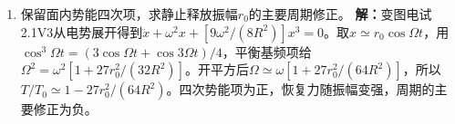 \documentclass[UTF8,fontset=fandol,a4paper,11pt]{ctexart}
\begin{document}
\begin{enumerate}
\item 保留面内势能四次项，求静止释放振幅$r_0$的主要周期修正。
\textbf{解：}变图电试2.1V3从电势展开得到$\ddot x+\omega^2x+[9\omega^2/(8R^2)]x^3=0$。取$x\simeq r_0\cos\Omega t$，用$\cos^3\Omega t=(3\cos\Omega t+\cos3\Omega t)/4$，平衡基频项给$\Omega^2=\omega^2[1+27r_0^2/(32R^2)]$。开平方后$\Omega\simeq\omega[1+27r_0^2/(64R^2)]$，所以$T/T_0\simeq1-27r_0^2/(64R^2)$。四次势能项为正，恢复力随振幅变强，周期的主要修正为负。
\begin{center}\begin{minipage}{.98\linewidth}\centering
{}
\end{minipage}
\end{center}
\end{enumerate}
\end{document}
